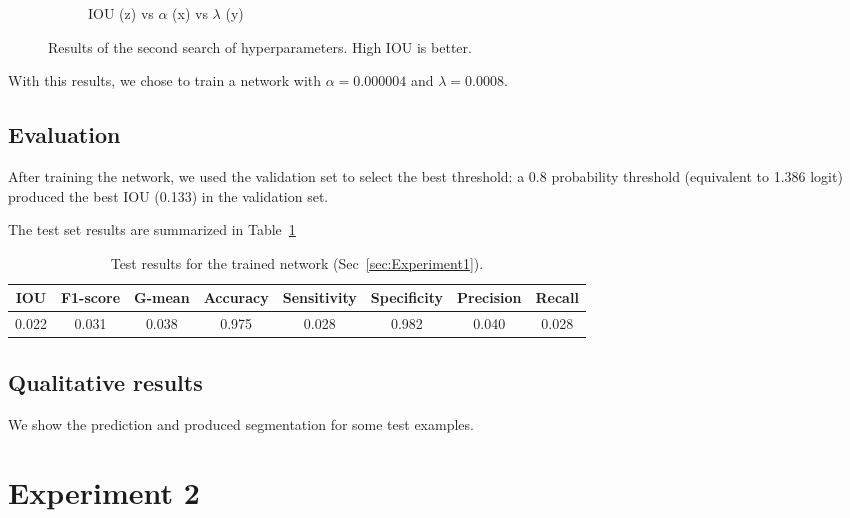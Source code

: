 \begin{figure}[h]
\begin{subfigure}{0.32\textwidth}
         \caption{IOU (z) vs $\alpha$ (x) vs $\lambda$ (y)}
	\end{subfigure}
	\caption[Second hyperparameter search for Experiment 1]{Results of the second search of hyperparameters. High IOU is better.}
	 \label{fig:Hs2}
\end{figure}

With this results, we chose to train a network with $\alpha = 0.000004$ and $\lambda = 0.0008$.

\subsection{Evaluation}
After training the network, we used the validation set to select the best threshold: a 0.8 probability threshold (equivalent to 1.386 logit) produced the best IOU (0.133) in the validation set.

The test set results are summarized in Table~\ref{tab:Results1}
\begin{table}[h]
	\centering
	\begin{tabular}{cccccccc}
	\hline
	\textbf{IOU}	& \textbf{F1-score}	& \textbf{G-mean} &\textbf{Accuracy}	& \textbf{Sensitivity} & \textbf{Specificity} & \textbf{Precision} & \textbf{Recall}\\
	\hline
	0.022 & 0.031 & 0.038 & 0.975 & 0.028 & 0.982 & 0.040 & 0.028\\
	\hline
	\end{tabular}
	\caption[Results for Experiment 1]{Test results for the trained network (Sec~\ref{sec:Experiment1}).}
	\label{tab:Results1}
\end{table}

\subsection{Qualitative results}
We show the prediction and produced segmentation for some test examples.%



\section{Experiment 2}

